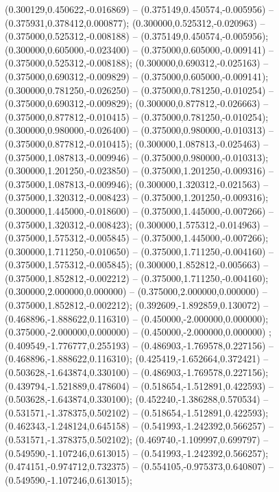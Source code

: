  (0.300129,0.450622,-0.016869) -- (0.375149,0.450574,-0.005956) -- (0.375931,0.378412,0.000877);
 (0.300000,0.525312,-0.020963) -- (0.375000,0.525312,-0.008188) -- (0.375149,0.450574,-0.005956);
 (0.300000,0.605000,-0.023400) -- (0.375000,0.605000,-0.009141) -- (0.375000,0.525312,-0.008188);
 (0.300000,0.690312,-0.025163) -- (0.375000,0.690312,-0.009829) -- (0.375000,0.605000,-0.009141);
 (0.300000,0.781250,-0.026250) -- (0.375000,0.781250,-0.010254) -- (0.375000,0.690312,-0.009829);
 (0.300000,0.877812,-0.026663) -- (0.375000,0.877812,-0.010415) -- (0.375000,0.781250,-0.010254);
 (0.300000,0.980000,-0.026400) -- (0.375000,0.980000,-0.010313) -- (0.375000,0.877812,-0.010415);
 (0.300000,1.087813,-0.025463) -- (0.375000,1.087813,-0.009946) -- (0.375000,0.980000,-0.010313);
 (0.300000,1.201250,-0.023850) -- (0.375000,1.201250,-0.009316) -- (0.375000,1.087813,-0.009946);
 (0.300000,1.320312,-0.021563) -- (0.375000,1.320312,-0.008423) -- (0.375000,1.201250,-0.009316);
 (0.300000,1.445000,-0.018600) -- (0.375000,1.445000,-0.007266) -- (0.375000,1.320312,-0.008423);
 (0.300000,1.575312,-0.014963) -- (0.375000,1.575312,-0.005845) -- (0.375000,1.445000,-0.007266);
 (0.300000,1.711250,-0.010650) -- (0.375000,1.711250,-0.004160) -- (0.375000,1.575312,-0.005845);
 (0.300000,1.852812,-0.005663) -- (0.375000,1.852812,-0.002212) -- (0.375000,1.711250,-0.004160);
 (0.300000,2.000000,0.000000) -- (0.375000,2.000000,0.000000) -- (0.375000,1.852812,-0.002212);
 (0.392609,-1.892859,0.130072) -- (0.468896,-1.888622,0.116310) -- (0.450000,-2.000000,0.000000);
 (0.375000,-2.000000,0.000000) -- (0.450000,-2.000000,0.000000) ;
 (0.409549,-1.776777,0.255193) -- (0.486903,-1.769578,0.227156) -- (0.468896,-1.888622,0.116310);
 (0.425419,-1.652664,0.372421) -- (0.503628,-1.643874,0.330100) -- (0.486903,-1.769578,0.227156);
 (0.439794,-1.521889,0.478604) -- (0.518654,-1.512891,0.422593) -- (0.503628,-1.643874,0.330100);
 (0.452240,-1.386288,0.570534) -- (0.531571,-1.378375,0.502102) -- (0.518654,-1.512891,0.422593);
 (0.462343,-1.248124,0.645158) -- (0.541993,-1.242392,0.566257) -- (0.531571,-1.378375,0.502102);
 (0.469740,-1.109997,0.699797) -- (0.549590,-1.107246,0.613015) -- (0.541993,-1.242392,0.566257);
 (0.474151,-0.974712,0.732375) -- (0.554105,-0.975373,0.640807) -- (0.549590,-1.107246,0.613015);
